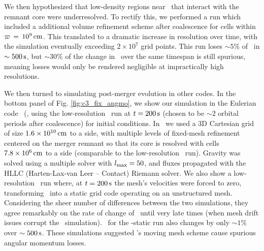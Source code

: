 We then hypothesized that low-density regions near \innercyl\ that interact with the remnant core were underresolved. To rectify this, we performed a run which included a additional volume refinement scheme after coalescence for cells within $\varpi\,=\,10^9\,\mathrm{cm}$.  This translated to a dramatic increase in resolution over time, with the simulation eventually exceeding $2\times10^7$ grid points.  This run loses $\sim5$\% of \Lztot\ in $\sim500\,\mathrm{s}$, but $\sim30$\% of the change in \Lzinner\ over the same timespan is still spurious, meaning losses would only be rendered negligible at impractically high resolutions.



We then turned to simulating post-merger evolution in other codes.  In the bottom panel of Fig. \ref{fig:c3_fix_angmo}, we show our simulation in the Eulerian code \flash\ (\citealt{fryx+00, dube+09}, using the low-resolution \arepo\ run at $t = 200\,\mathrm{s}$ (chosen to be $\sim2$ orbital periods after coalescence) for initial conditions.  In \flash\ we used a 3D Cartesian grid of size $1.6\times10^{10}\,\mathrm{cm}$ to a side, with multiple levels of fixed-mesh refinement centered on the merger remnant so that its core is resolved with cells $7.8\times10^6\,\mathrm{cm}$ to a side (comparable to the low-resolution \arepo\ run).  Gravity was solved using a multiple solver with $l_\mathrm{max} = 50$, and fluxes propagated with the HLLC (Harten-Lax-van Leer -- Contact) Riemann solver.  We also show a low-resolution \arepo\ run where, at $t = 200\,\mathrm{s}$ the mesh's velocities were forced to zero, transforming \arepo\ into a static grid code operating on an unstructured mesh.  Considering the sheer number of differences between the two simulations, they agree remarkably on the rate of change of \Lzinner\ until very late times (when mesh drift issues corrupt the \arepo\ simulation).  \Lztot\ for the \arepo-static run also changes by only $\sim1$\% over $\sim500\,\mathrm{s}$.  These simulations suggested \arepo's moving mesh scheme cause spurious angular momentum losses.

